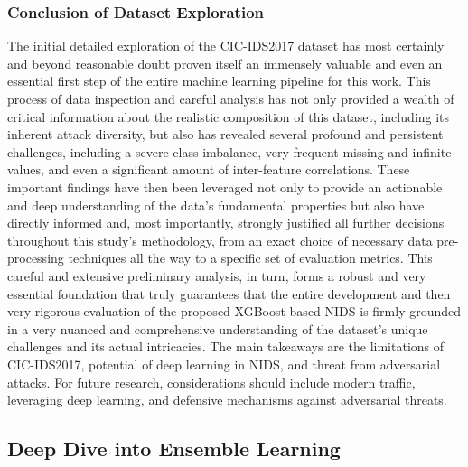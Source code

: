\subsubsection{Conclusion of Dataset Exploration} 
The initial detailed exploration of the CIC-IDS2017 dataset has most certainly and beyond reasonable doubt proven itself an immensely valuable and even an essential first step of the entire machine learning pipeline for this work. This process of data inspection and careful analysis has not only provided a wealth of critical information about the realistic composition of this dataset, including its inherent attack diversity, but also has revealed several profound and persistent challenges, including a severe class imbalance, very frequent missing and infinite values, and even a significant amount of inter-feature correlations. These important findings have then been leveraged not only to provide an actionable and deep understanding of the data's fundamental properties but also have directly informed and, most importantly, strongly justified all further decisions throughout this study's methodology, from an exact choice of necessary data pre-processing techniques all the way to a specific set of evaluation metrics. This careful and extensive preliminary analysis, in turn, forms a robust and very essential foundation that truly guarantees that the entire development and then very rigorous evaluation of the proposed XGBoost-based NIDS is firmly grounded in a very nuanced and comprehensive understanding of the dataset's unique challenges and its actual intricacies. The main takeaways are the limitations of CIC-IDS2017, potential of deep learning in NIDS, and threat from adversarial attacks. For future research, considerations should include modern traffic, leveraging deep learning, and defensive mechanisms against adversarial threats.




\subsection{Deep Dive into Ensemble Learning} 

